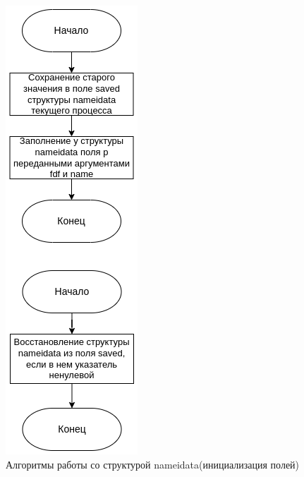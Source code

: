 \documentclass[12pt,a4paper]{scrreprt}
\begin{document}
\begin{figure}[H]
	\centering
	\includegraphics[scale=0.6]{pics/nameidata.png}
	\caption{Алгоритмы работы со структурой nameidata(инициализация полей)}
\end{figure}
\end{document}

